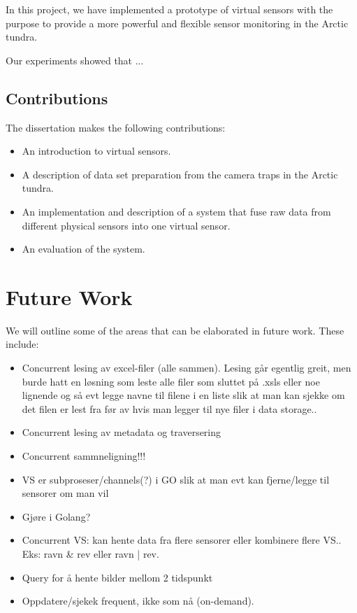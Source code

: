 \documentclass[USenglish]{uit-thesis}
\begin{document}
In this project, we have implemented a prototype of virtual sensors with the purpose to provide a more powerful and flexible sensor monitoring in the Arctic tundra. 

Our experiments showed that ...

\section{Contributions}
The dissertation makes the following contributions:

\begin{itemize}
\item An introduction to virtual sensors.
\item A description of data set preparation from the camera traps in the Arctic tundra.
\item An implementation and description of a system that fuse raw data from different physical sensors into one virtual sensor.
\item An evaluation of the system.
\end{itemize}



\chapter{Future Work}
We will outline some of the areas that can be elaborated in future work. These include:

\begin{itemize}

\item Concurrent lesing av excel-filer (alle sammen). Lesing går egentlig greit, men burde hatt en løsning som leste alle filer som sluttet på .xsls eller noe lignende og så evt legge navne til filene i en liste slik at man kan sjekke om det filen er lest fra før av hvis man legger til nye filer i data storage..
\item Concurrent lesing av metadata og traversering
\item Concurrent sammneligning!!!
\item VS er subproseser/channels(?) i GO slik at man evt kan fjerne/legge til sensorer om man vil
\item Gjøre i Golang?
\item Concurrent VS: kan hente data fra flere sensorer eller kombinere flere VS.. Eks: ravn \& rev eller ravn | rev.
\item Query for å hente bilder mellom 2 tidspunkt
\item Oppdatere/sjekek frequent, ikke som nå (on-demand).
\end{itemize}
\end{document}
